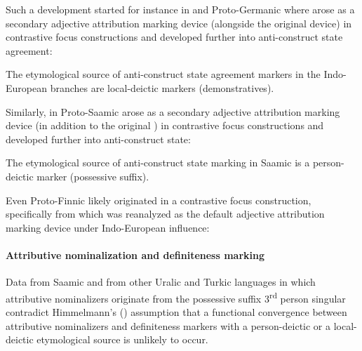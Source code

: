 Such a development started for instance in  and Proto\hyp{}Germanic where  arose as a secondary adjective attribution marking device (alongside the original  device) in contrastive focus constructions and developed further into anti\hyp{}construct state agreement:
\begin{exe}
\end{exe}
The etymological source of anti\hyp{}construct state agreement markers in the Indo-European branches are local-deictic markers (demonstratives).

Similarly, in Proto\hyp{}Saamic  arose as a secondary adjective attribution marking device (in addition to the original ) in contrastive focus constructions and developed further into anti\hyp{}construct state:
\begin{exe}
\end{exe}
The etymological source of anti\hyp{}construct state marking in Saamic is a person-deictic marker (possessive suffix).

Even Proto\hyp{}Finnic  likely originated in a contrastive focus construction, specifically from  which was reanalyzed as the default adjective attribution marking device under Indo-European influence:
\begin{exe}
\end{exe}

\paragraph*{Attributive nominalization and definiteness marking}
Data from Saamic and from other Uralic and Turkic languages in which attributive nominalizers originate from the possessive suffix 3\textsuperscript{rd} person singular contradict Himmelmann's (\citeyear[220–221]{himmelmann1997}) assumption that a functional convergence between attributive nominalizers and definiteness markers with a person-deictic or a local-deictic etymological source is unlikely to occur. 

